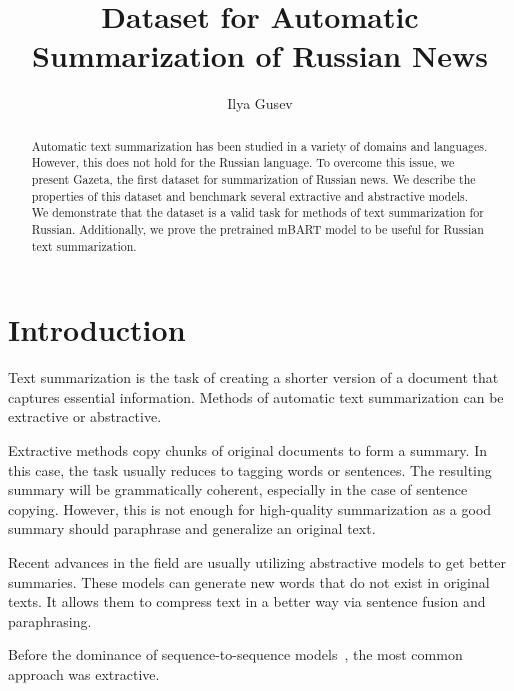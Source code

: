 \documentclass[runningheads]{llncs}
\begin{document}
\title{Dataset for Automatic Summarization of Russian News}

\author{Ilya Gusev}


\maketitle

\begin{abstract}
Automatic text summarization has been studied in a variety of domains and languages. However, this does not hold for the Russian language. To overcome this issue, we present Gazeta, the first dataset for summarization of Russian news. We describe the properties of this dataset and benchmark several extractive and abstractive models. We demonstrate that the dataset is a valid task for methods of text summarization for Russian. Additionally, we prove the pretrained mBART model to be useful for Russian text summarization.

\end{abstract}

\section{Introduction}
Text summarization is the task of creating a shorter version of a document that captures essential information. Methods of automatic text summarization can be extractive or abstractive.

Extractive methods copy chunks of original documents to form a summary. In this case, the task usually reduces to tagging words or sentences. The resulting summary will be grammatically coherent, especially in the case of sentence copying. However, this is not enough for high-quality summarization as a good summary should paraphrase and generalize an original text.

Recent advances in the field are usually utilizing abstractive models to get better summaries. These models can generate new words that do not exist in original texts. It allows them to compress text in a better way via sentence fusion and paraphrasing.

Before the dominance of sequence-to-sequence models~\cite{sutskever_seq2seq}, the most common approach was extractive.
\end{document}
